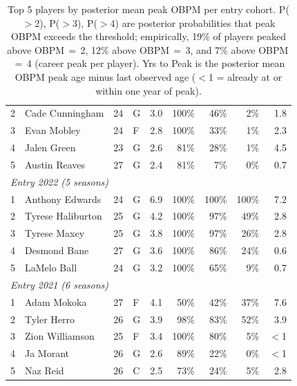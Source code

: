 \begin{table}[htbp]
\begin{tabular}{rlrlrrrrr}
    2 & Cade Cunningham & 24 & G & 3.0 & 100\% & 46\% & 2\% & 1.8 \\
    3 & Evan Mobley & 24 & F & 2.8 & 100\% & 33\% & 1\% & 2.3 \\
    4 & Jalen Green & 23 & G & 2.6 & 81\% & 28\% & 1\% & 4.5 \\
    5 & Austin Reaves & 27 & G & 2.4 & 81\% & 7\% & 0\% & 0.7 \\
    \midrule[0.4pt]
    \multicolumn{9}{l}{\textit{Entry 2022 (5 seasons)}} \\
    \midrule
    1 & Anthony Edwards & 24 & G & 6.9 & 100\% & 100\% & 100\% & 7.2 \\
    2 & Tyrese Haliburton & 25 & G & 4.2 & 100\% & 97\% & 49\% & 2.8 \\
    3 & Tyrese Maxey & 25 & G & 3.8 & 100\% & 97\% & 26\% & 2.8 \\
    4 & Desmond Bane & 27 & G & 3.6 & 100\% & 86\% & 24\% & 0.6 \\
    5 & LaMelo Ball & 24 & G & 3.2 & 100\% & 65\% & 9\% & 0.7 \\
    \midrule[0.4pt]
    \multicolumn{9}{l}{\textit{Entry 2021 (6 seasons)}} \\
    \midrule
    1 & Adam Mokoka & 27 & F & 4.1 & 50\% & 42\% & 37\% & 7.6 \\
    2 & Tyler Herro & 26 & G & 3.9 & 98\% & 83\% & 52\% & 3.9 \\
    3 & Zion Williamson & 25 & F & 3.4 & 100\% & 80\% & 5\% & $<$1 \\
    4 & Ja Morant & 26 & G & 2.6 & 89\% & 22\% & 0\% & $<$1 \\
    5 & Naz Reid & 26 & C & 2.5 & 73\% & 24\% & 5\% & 2.8 \\
    \bottomrule
  \end{tabular}
  \caption{Top 5 players by posterior mean peak OBPM per entry cohort. P($>$2), P($>$3), P($>$4) are posterior probabilities that peak OBPM exceeds the threshold; empirically, 19\% of players peaked above OBPM\,$=$\,2, 12\% above OBPM\,$=$\,3, and 7\% above OBPM\,$=$\,4 (career peak per player). Yrs to Peak is the posterior mean OBPM peak age minus last observed age ($<$1 = already at or within one year of peak).}
  \label{tab:breakout_cohort}
\end{table}

